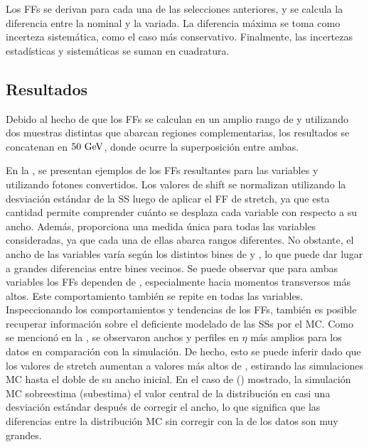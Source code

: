 Los \acp{FF} se derivan para cada una de las selecciones anteriores, y se calcula la diferencia entre la nominal y la variada. La diferencia máxima se toma como incerteza sistemática, como el caso más conservativo. Finalmente, las incertezas estad\'isticas y sistem\'aticas se suman en cuadratura.










\subsection{Resultados}
\label{subsec:ss_corrections:ffs:results}


Debido al hecho de que los \acp{FF} se calculan en un amplio rango de \pt y utilizando dos muestras distintas que abarcan regiones complementarias, los resultados se concatenan en \(50~\text{GeV}\), donde ocurre la superposici\'on entre ambas.


En la \Fig{\ref{fig:ss_corrections:ffs:reslts:ffs}}, se presentan ejemplos de los \acp{FF} resultantes para las variables \reta y \weta utilizando fotones convertidos.
Los valores de shift se normalizan utilizando la desviaci\'on est\'andar de la \ac{SS} luego de aplicar el \ac{FF} de stretch, ya que esta cantidad permite comprender cuánto se desplaza cada variable con respecto a su ancho. Además, proporciona una medida única para todas las variables consideradas, ya que cada una de ellas abarca rangos diferentes. No obstante, el ancho de las variables varía según los distintos bines de \pt y \abseta, lo que puede dar lugar a grandes diferencias entre bines vecinos.
Se puede observar que para ambas variables los \acp{FF} dependen de \pt, especialmente hacia momentos transversos más altos. Este comportamiento también se repite en todas las variables.
Inspeccionando los comportamientos y tendencias de los \acp{FF}, también es posible recuperar información sobre el deficiente modelado de las \acp{SS} por el \ac{MC}. Como se mencion\'o en la \Sect{\ref{sec:pid_ss:ss_differences}}, se observaron anchos y perfiles en \(\eta\) más amplios para los datos en comparación con la simulación. De hecho, esto se puede inferir dado que los valores de stretch aumentan a valores más altos de \pt, estirando las simulaciones \ac{MC} hasta el doble de su ancho inicial. En el caso de \reta (\weta) mostrado, la simulación \ac{MC} sobreestima (subestima) el valor central de la distribuci\'on en casi una desviación estándar después de corregir el ancho, lo que significa que las diferencias entre la distribución \ac{MC} sin corregir con la de los datos son muy grandes.

